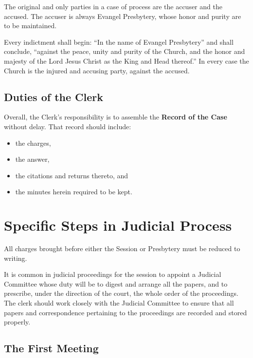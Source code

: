 \documentclass[
]{book}
\providecommand{\tightlist}{%
  \setlength{\itemsep}{0pt}\setlength{\parskip}{0pt}}
\begin{document}
The original and only parties in a case of process are the accuser and the accused. The accuser is always Evangel Presbytery, whose honor and purity are to be maintained.

Every indictment shall begin: ``In the name of Evangel Presbytery'' and shall conclude, ``against the peace, unity and purity of the Church, and the honor and majesty of the Lord Jesus Christ as the King and Head thereof.'' In every case the Church is the injured and accusing party, against the accused.

\hypertarget{duties-of-the-clerk}{%
\subsection{Duties of the Clerk}\label{duties-of-the-clerk}}

Overall, the Clerk's responsibility is to assemble the \textbf{Record of the Case} without delay. That record should include:

\begin{itemize}
\tightlist
\item
  the charges,
\item
  the answer,
\item
  the citations and returns thereto, and
\item
  the minutes herein required to be kept.
\end{itemize}

\hypertarget{specific-steps-in-judicial-process}{%
\section{Specific Steps in Judicial Process}\label{specific-steps-in-judicial-process}}

All charges brought before either the Session or Presbytery must be reduced to writing.

It is common in judicial proceedings for the session to appoint a Judicial Committee whose duty will be to digest and arrange all the papers, and to prescribe, under the direction of the court, the whole order of the proceedings. The clerk should work closely with the Judicial Committee to ensure that all papers and correspondence pertaining to the proceedings are recorded and stored properly.

\hypertarget{the-first-meeting}{%
\subsection{The First Meeting}\label{the-first-meeting}}
\end{document}
